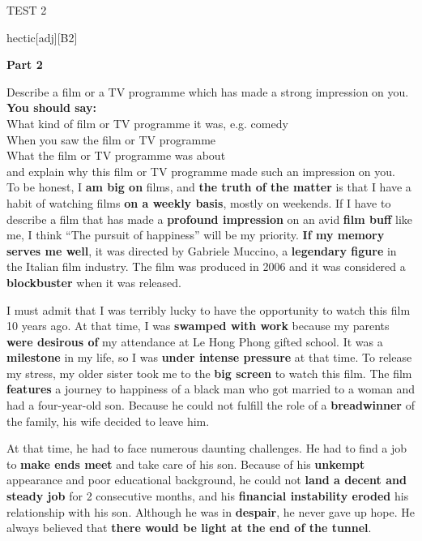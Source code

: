 \begin{glossarymc}[Cambridge 3]
\begin{test}{TEST 2}
\begin{VocabExplain}[Part 1]
\begin{ExplainCard}{hectic}[adj][B2]
\end{ExplainCard}

\end{VocabExplain}
\noindent
\textbf{Part 2}

\begin{qa}{Describe a film or a TV programme which has made a strong impression on you.}
\textbf{You should say:}\\
What kind of film or TV programme it was, e.g. comedy\\
When you saw the film or TV programme  \\
What the film or TV programme was about  \\
and explain why this film or TV programme made such an impression on you.  \\

To be honest, I \textbf{am big on} films, and \textbf{the truth of the matter} is that I have a habit of watching films \textbf{on a weekly basis}, mostly on weekends. If I have to describe a film that has made a \textbf{profound impression} on an avid \textbf{film buff} like me, I think ``The pursuit of happiness'' will be my priority. \textbf{If my memory serves me well}, it was directed by Gabriele Muccino, a \textbf{legendary figure} in the Italian film industry. The film was produced in 2006 and it was considered a \textbf{blockbuster} when it was released.  

I must admit that I was terribly lucky to have the opportunity to watch this film 10 years ago. At that time, I was \textbf{swamped with work} because my parents \textbf{were desirous of} my attendance at Le Hong Phong gifted school. It was a \textbf{milestone} in my life, so I was \textbf{under intense pressure} at that time. To release my stress, my older sister took me to the \textbf{big screen} to watch this film. The film \textbf{features} a journey to happiness of a black man who got married to a woman and had a four-year-old son. Because he could not fulfill the role of a \textbf{breadwinner} of the family, his wife decided to leave him.  

At that time, he had to face numerous daunting challenges. He had to find a job to \textbf{make ends meet} and take care of his son. Because of his \textbf{unkempt} appearance and poor educational background, he could not \textbf{land a decent and steady job} for 2 consecutive months, and his \textbf{financial instability eroded} his relationship with his son. Although he was in \textbf{despair}, he never gave up hope. He always believed that \textbf{there would be light at the end of the tunnel}.  


\end{qa}
\end{test}
\end{glossarymc}

